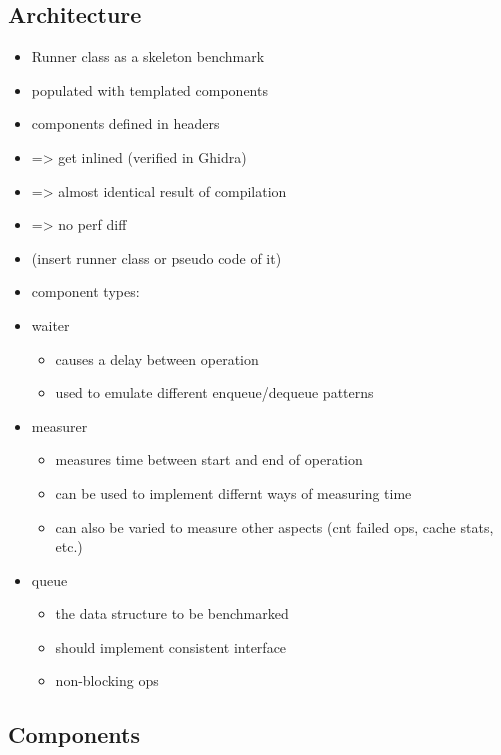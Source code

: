 \documentclass{article}
\begin{document}
\subsection{Architecture}
\begin{itemize}
    \item Runner class as a skeleton benchmark
    \item populated with templated components
    \item components defined in headers
    \item => get inlined (verified in Ghidra)
    \item => almost identical result of compilation
    \item => no perf diff
    \item (insert runner class or pseudo code of it)
    \item component types:
    \item waiter
        \begin{itemize}
            \item causes a delay between operation
            \item used to emulate different enqueue/dequeue patterns
        \end{itemize}
    \item measurer
        \begin{itemize}
            \item measures time between start and end of operation
            \item can be used to implement differnt ways of measuring time
            \item can also be varied to measure other aspects (cnt failed ops, cache stats, etc.)
        \end{itemize}
    \item queue
        \begin{itemize}
            \item the data structure to be benchmarked
            \item should implement consistent interface
            \item non-blocking ops
        \end{itemize}
\end{itemize}

\subsection{Components}
\end{document}
